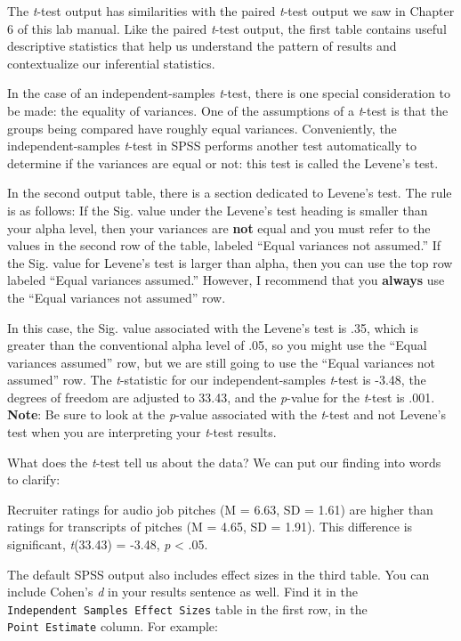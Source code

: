 \documentclass[
]{book}
\begin{document}
The \emph{t}-test output has similarities with the paired \emph{t}-test output we saw in Chapter 6 of this lab manual. Like the paired \emph{t}-test output, the first table contains useful descriptive statistics that help us understand the pattern of results and contextualize our inferential statistics.

In the case of an independent-samples \emph{t}-test, there is one special consideration to be made: the equality of variances. One of the assumptions of a \emph{t}-test is that the groups being compared have roughly equal variances. Conveniently, the independent-samples \emph{t}-test in SPSS performs another test automatically to determine if the variances are equal or not: this test is called the Levene's test.

In the second output table, there is a section dedicated to Levene's test. The rule is as follows: If the Sig. value under the Levene's test heading is smaller than your alpha level, then your variances are \textbf{not} equal and you must refer to the values in the second row of the table, labeled ``Equal variances not assumed.'' If the Sig. value for Levene's test is larger than alpha, then you can use the top row labeled ``Equal variances assumed.'' However, I recommend that you \textbf{always} use the ``Equal variances not assumed'' row.

In this case, the Sig. value associated with the Levene's test is .35, which is greater than the conventional alpha level of .05, so you might use the ``Equal variances assumed'' row, but we are still going to use the ``Equal variances not assumed'' row. The \emph{t}-statistic for our independent-samples \emph{t}-test is -3.48, the degrees of freedom are adjusted to 33.43, and the \emph{p}-value for the \emph{t}-test is .001. \textbf{Note}: Be sure to look at the \emph{p}-value associated with the \emph{t}-test and not Levene's test when you are interpreting your \emph{t}-test results.

What does the \emph{t}-test tell us about the data? We can put our finding into words to clarify:

Recruiter ratings for audio job pitches (M = 6.63, SD = 1.61) are higher than ratings for transcripts of pitches (M = 4.65, SD = 1.91). This difference is significant, \emph{t}(33.43) = -3.48, \emph{p} \textless{} .05.

The default SPSS output also includes effect sizes in the third table. You can include Cohen's \emph{d} in your results sentence as well. Find it in the \texttt{Independent\ Samples\ Effect\ Sizes} table in the first row, in the \texttt{Point\ Estimate} column. For example:
\end{document}
